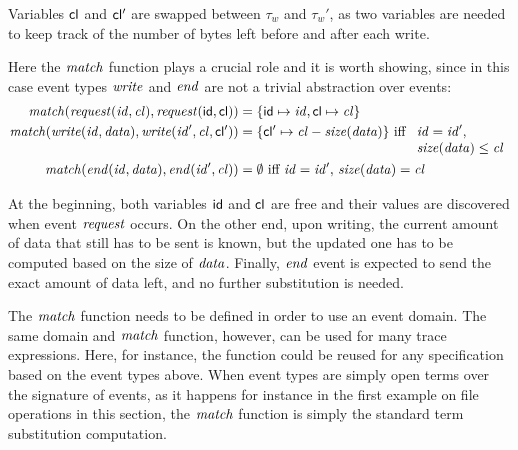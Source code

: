 Variables \(\mathsf{cl}\) and \(\mathsf{cl'}\) are swapped between \(\tau_w\) and \(\tau_w'\), as two variables are needed to keep track of the number of bytes left before and after each write.

Here the \(\mathit{match}\) function plays a crucial role and it is worth showing, since in this case event types $\mathit{write}$ and $\mathit{end}$ are not a trivial abstraction over events:
\begin{align*}
\mathit{match}(\mathit{request}(\mathit{id}, \mathit{cl}), \mathit{request}(\mathsf{id}, \mathsf{cl})) &= \{ \mathsf{id} \mapsto \mathit{id}, \mathsf{cl} \mapsto \mathit{cl} \}\\
\mathit{match}(\mathit{write}(\mathit{id}, \mathit{data}), \mathit{write}(\mathit{id}', \mathit{cl}, \mathsf{cl'})) &= \{ \mathsf{cl'} \mapsto \mathit{cl}-\mathit{size}(\mathit{data}) \} \mbox{ iff $\begin{array}[t]{l}\mathit{id}=\mathit{id}',\\ \mathit{size}(\mathit{data})\leq\mathit{cl}\end{array}$} \\
\mathit{match}(\mathit{end}(\mathit{id}, \mathit{data}), \mathit{end}(\mathit{id}', \mathit{cl})) &= \emptyset \mbox{ iff $\mathit{id}=\mathit{id}',\, \mathit{size}(\mathit{data})=\mathit{cl}$}
\end{align*}

At the beginning, both variables \(\mathsf{id}\) and \(\mathsf{cl}\) are free and their values are discovered when event \(\mathit{request}\) occurs.
On the other end, upon writing, the current amount of data that still has to be sent is known, but the updated one has to be computed based on the
size of $\mathit{data}$.
Finally, \(\mathit{end}\) event is expected to send the exact amount of data left, and no further substitution is needed.

The \(\mathit{match}\) function needs to be defined in order to use an event domain.
The same domain and \(\mathit{match}\) function, however, can be used for many trace expressions.
Here, for instance, the function could be reused for any specification based on the event types above.
When event types are simply open terms over the signature of events, as it happens for instance in the first example on file operations in this section, the \(\mathit{match}\) function is simply the standard term substitution computation.
